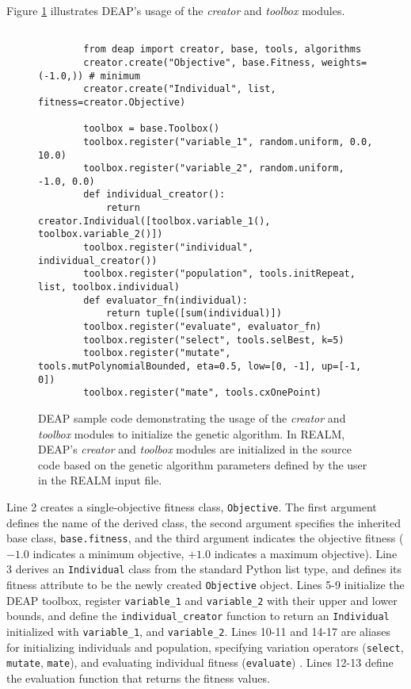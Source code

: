 Figure \ref{fig:deap-code} illustrates DEAP's usage of the \textit{creator} and
\textit{toolbox} modules. 
\begin{figure}[]
    \begin{verbatim}
        
        from deap import creator, base, tools, algorithms
        creator.create("Objective", base.Fitness, weights=(-1.0,)) # minimum
        creator.create("Individual", list, fitness=creator.Objective)

        toolbox = base.Toolbox()
        toolbox.register("variable_1", random.uniform, 0.0, 10.0)
        toolbox.register("variable_2", random.uniform, -1.0, 0.0)
        def individual_creator():
            return creator.Individual([toolbox.variable_1(), toolbox.variable_2()])
        toolbox.register("individual", individual_creator())
        toolbox.register("population", tools.initRepeat, list, toolbox.individual)
        def evaluator_fn(individual):
            return tuple([sum(individual)])
        toolbox.register("evaluate", evaluator_fn)
        toolbox.register("select", tools.selBest, k=5)
        toolbox.register("mutate", tools.mutPolynomialBounded, eta=0.5, low=[0, -1], up=[-1, 0])
        toolbox.register("mate", tools.cxOnePoint)
    \end{verbatim}
    \caption{DEAP sample code demonstrating the usage of the \textit{creator} and
    \textit{toolbox} modules to initialize the genetic algorithm. In REALM, DEAP's 
    \textit{creator} and \textit{toolbox} modules are initialized in the source 
    code based on the genetic algorithm parameters defined by the user in the 
    REALM input file. }
    \label{fig:deap-code}
\end{figure}
Line 2 creates a single-objective fitness class, \texttt{Objective}. 
The first argument defines the name of the derived class, the second argument 
specifies the inherited base class, \texttt{base.fitness}, and the third 
argument indicates the objective fitness ($-1.0$ indicates a minimum objective, 
$+1.0$ indicates a maximum objective). 
Line 3 derives an \texttt{Individual} class from the standard Python list type,
and defines its fitness attribute to be the newly created \texttt{Objective} object. 
Lines 5-9 initialize the \gls{DEAP} toolbox, register 
\texttt{variable\_1} and \texttt{variable\_2} with their upper and lower bounds, 
and define the \texttt{individual\_creator} function to return an 
\texttt{Individual} initialized with \texttt{variable\_1}, and \texttt{variable\_2}. 
Lines 10-11 and 14-17 are aliases for initializing individuals and population, 
specifying variation operators (\texttt{select}, \texttt{mutate}, \texttt{mate}), 
and evaluating individual fitness (\texttt{evaluate}) \cite{fortin_deap_2012}. 
Lines 12-13 define the evaluation function that returns the fitness values. 

